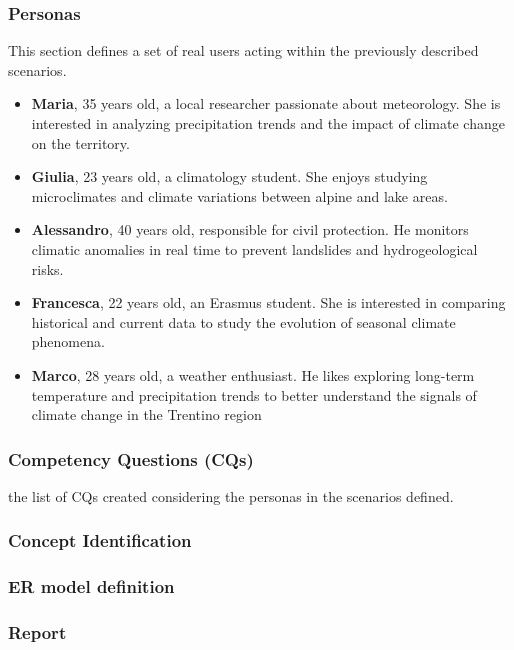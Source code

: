 \subsubsection{Personas}
This section defines a set of real users acting within the previously described scenarios.
\begin{itemize}
    \item \textbf{Maria}, 35 years old, a local researcher passionate about meteorology. She is interested in analyzing precipitation trends and the impact of climate change on the territory.
    \item \textbf{Giulia}, 23 years old, a climatology student. She enjoys studying microclimates and climate variations between alpine and lake areas.
    \item \textbf{Alessandro}, 40 years old, responsible for civil protection. He monitors climatic anomalies in real time to prevent landslides and hydrogeological risks.
    \item \textbf{Francesca}, 22 years old, an Erasmus student. She is interested in comparing historical and current data to study the evolution of seasonal climate phenomena.
    \item \textbf{Marco}, 28 years old, a weather enthusiast. He likes exploring long-term temperature and precipitation trends to better understand the signals of climate change in the Trentino region
\end{itemize}



\subsubsection{Competency Questions (CQs)}
the list of CQs created considering the personas in the scenarios defined.
\subsubsection{Concept Identification}
\subsubsection{ER model definition}
\subsubsection{Report}






